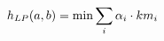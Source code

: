 \documentclass[preview]{standalone}
\begin{document}
\begin{align*}
\special{dvisvgm:raw <g id='unique000'>}h_{LP}(a,b) = \min \sum_i \alpha_i \cdot km_i\special{dvisvgm:raw </g>}
\end{align*}
\end{document}
